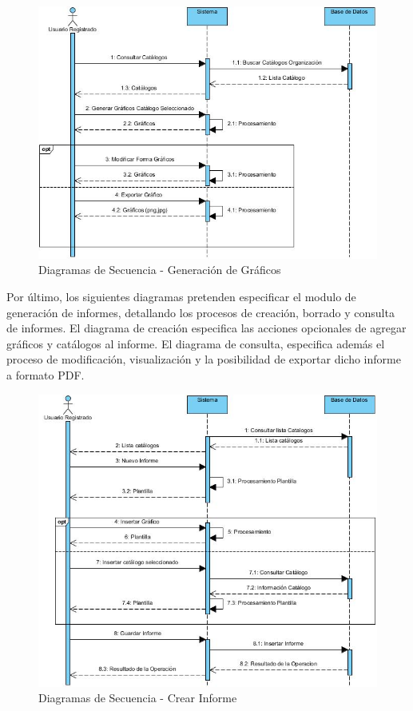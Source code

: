 \documentclass[a4paper,11pt]{book}
\begin{document}
\begin{figure}[H] 
\centering 
\includegraphics[scale=0.50]{imagenes/secuencia/Graficos.jpg}
\caption{ Diagramas de Secuencia - Generación de Gráficos\cite{diagrama}  }  
\end{figure}

Por último, los siguientes diagramas pretenden especificar el modulo de generación de informes, detallando los procesos de creación, borrado y consulta de informes. El diagrama de creación especifica las acciones opcionales de agregar gráficos y catálogos al informe. El diagrama de consulta, especifica además el proceso de modificación, visualización y la posibilidad de exportar dicho informe a formato PDF. 

\begin{figure}[H] 
\centering 
\includegraphics[scale=0.50]{imagenes/secuencia/Crear_Informe.jpg}
\caption{ Diagramas de Secuencia - Crear Informe\cite{diagrama}  }  
\end{figure}
\end{document}
